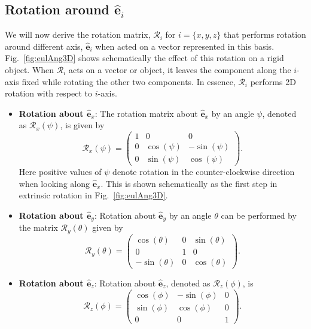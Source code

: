 \documentclass{article}
\def\eh{\hat{\mathbf{e}}}
\def\R{\mathcal{R}}
\begin{document}
\subsection{Rotation around \texorpdfstring{$\eh_i$}{eh}}
We will now derive the rotation matrix, $\R_i$ for $i = \{ x, y, z \}$ that performs rotation around different axis, $\eh_i$ when acted on a vector represented in this basis. Fig.~\ref{fig:eulAng3D} shows schematically the effect of this rotation on a rigid object. When $\R_i$ acts on a vector or object, it leaves the component along the $i$-axis fixed while rotating the other two components. In essence, $\R_i$ performs 2D rotation with respect to $i$-axis.
\begin{itemize}
    \item \textbf{Rotation about $\eh_x$}: 
    The rotation matrix about $\eh_x$ by an angle $\psi$, denoted as $\R_x (\psi)$, is given by
    \[
      \R_x(\psi) = 
      \begin{pmatrix} 
    1 & 0 & 0 \\
    0 & \cos(\psi) & -\sin(\psi) \\
    0 & \sin(\psi) & \cos(\psi) 
    \end{pmatrix}.
    \]
    Here positive values of $\psi$ denote rotation in the counter-clockwise direction when looking along $\eh_x$. This is shown schematically as the first step in extrinsic rotation in Fig.~\ref{fig:eulAng3D}.

    \item \textbf{Rotation about $\eh_y$}:
    Rotation about $\eh_y$ by an angle $\theta$ can be performed by the matrix $\R_y(\theta)$ given by
    \[
      \R_y(\theta) =
      \begin{pmatrix} 
    \cos(\theta) & 0 & \sin(\theta) \\
    0 & 1 & 0 \\
    -\sin(\theta) & 0 & \cos(\theta) 
    \end{pmatrix}.
    \]

    \item \textbf{Rotation about $\eh_z$}:
    Rotation about $\eh_z$, denoted as $\R_z(\phi)$, is
    \[
      \R_z(\phi) = 
      \begin{pmatrix} 
    \cos(\phi) & -\sin(\phi) & 0 \\
    \sin(\phi) & \cos(\phi) & 0 \\
    0 & 0 & 1 
    \end{pmatrix}.
    \]
\end{itemize}
\end{document}
